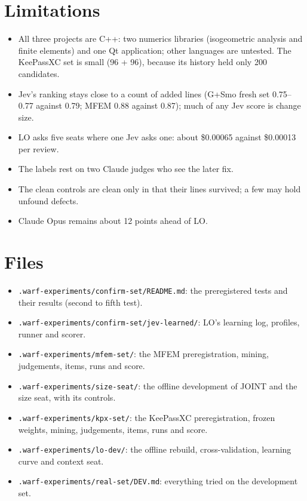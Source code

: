 \documentclass[11pt,a4paper]{article}
\begin{document}
\section{Limitations}

\begin{itemize}[leftmargin=1.5em]
\item All three projects are C++: two numerics libraries (isogeometric
  analysis and finite elements) and one Qt application; other languages are
  untested. The KeePassXC set is small (96 + 96), because its history held only
  200 candidates.
\item Jev's ranking stays close to a count of added lines (G+Smo fresh set
  0.75--0.77 against 0.79; MFEM 0.88 against 0.87); much of any Jev score is
  change size.
\item LO asks five seats where one Jev asks one: about \$0.00065 against
  \$0.00013 per review.
\item The labels rest on two Claude judges who see the later fix.
\item The clean controls are clean only in that their lines survived; a few may
  hold unfound defects.
\item Claude Opus remains about 12 points ahead of LO.
\end{itemize}

\section{Files}

\begin{itemize}[leftmargin=1.5em]
\item \texttt{.warf-experiments/confirm-set/README.md}: the preregistered tests
  and their results (second to fifth test).
\item \texttt{.warf-experiments/confirm-set/jev-learned/}: LO's learning log,
  profiles, runner and scorer.
\item \texttt{.warf-experiments/mfem-set/}: the MFEM preregistration, mining,
  judgements, items, runs and score.
\item \texttt{.warf-experiments/size-seat/}: the offline development of JOINT
  and the size seat, with its controls.
\item \texttt{.warf-experiments/kpx-set/}: the KeePassXC preregistration,
  frozen weights, mining, judgements, items, runs and score.
\item \texttt{.warf-experiments/lo-dev/}: the offline rebuild, cross-validation,
  learning curve and context seat.
\item \texttt{.warf-experiments/real-set/DEV.md}: everything tried on the
  development set.
\end{itemize}
\end{document}
